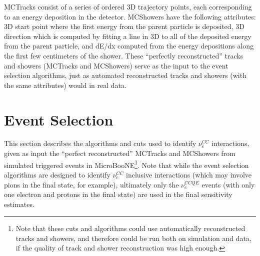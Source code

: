 
{\sc MCTracks} consist of a series of ordered 3D trajectory points, each corresponding to an energy deposition in the detector. {\sc MCShowers} have the following attributes: 3D start point where the first energy from the parent particle is deposited, 3D direction which is computed by fitting a line in 3D to all of the deposited energy from the parent particle, and dE/dx computed from the energy depositions along the first few centimeters of the shower. These ``perfectly reconstructed'' tracks and showers ({\sc MCTracks} and {\sc MCShowers}) serve as the input to the event selection algorithms, just as automated reconstructed tracks and showers (with the same attributes) would in real data.\\




\section{Event Selection}\label{LEE_eventselection_section}
This section describes the algorithms and cuts used to identify $\nu_e^{CC}$ interactions, given as input the ``perfect reconstructed'' {\sc MCTracks} and {\sc MCShowers} from simulated triggered events in MicroBooNE\footnote{Note that these cuts and algorithms could use automatically reconstructed tracks and showers, and therefore could be run both on simulation and data, if the quality of track and shower reconstruction was high enough.}. Note that while the event selection algorithms are designed to identify $\nu_e^{CC}$ inclusive interactions (which may involve pions in the final state, for example), ultimately only the $\nu_e^{CCQE}$ events (with only one electron and protons in the final state) are used in the final sensitivity estimates.\\

